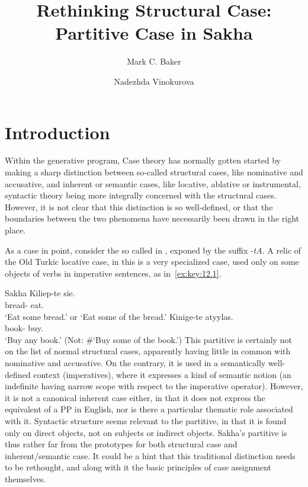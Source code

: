 \documentclass[output=paper]{langsci/langscibook}
\author{Mark C. Baker\affiliation{Rutgers University}\and Nadezhda Vinokurova\affiliation{Institute for Humanities Research and Indigenous Studies of the North, Siberian Branch, Russian Academy of Sciences}}
\title{Rethinking Structural Case: Partitive Case in Sakha}
\begin{document}
\glsresetall

\section{Introduction}

Within the generative program, Case theory has normally gotten started by
making a sharp distinction between so-called structural cases, like nominative
and accusative, and inherent or semantic
cases, like locative, ablative or
instrumental, syntactic theory being more integrally concerned with the
structural cases. However, it is not clear that this distinction is so
well-defined, or that the boundaries between the two phenomena have necessarily
been drawn in the right place.

As a case in point, consider the so called  in , exponed by
the suffix -\emph{tA}. A relic of the Old Turkic locative case, in  this
is a very specialized case, used only on some objects of verbs in imperative
sentences, as in~\eqref{ex:key:12.1}.

\ea\label{ex:key:12.1}Sakha \parencite[421, 429]{StachowskiMenz1998}
	\ea
		\gll Kiliep-te  sie.\\
			bread-\Part{}  eat.\Imp{}\\
		\glt ‘Eat some bread.’ or ‘Eat some of the bread.’
	\ex
		\gll Kinige-te  atyylas.\\
			book-\Part{}  buy.\Imp{}\\
		\glt ‘Buy any book.’  (Not: \#‘Buy some of the book.’)
	\z
\z
This partitive is certainly not on the list of normal
structural cases, apparently having little in common with nominative and
accusative. On the contrary, it is used in a semantically
well-defined context (imperatives), where it expresses a kind of semantic
notion (an indefinite having narrow scope with respect to the
imperative operator). However, it is not a canonical
inherent
case either, in that it does not express the equivalent of a PP in English, nor
is there a particular thematic role associated with it. Syntactic structure
seems relevant to the partitive, in that it is found only on
direct objects, not on subjects or indirect objects. Sakha’s
partitive is thus rather far from the prototypes for both
structural case and inherent/semantic case. It could be a hint that this
traditional distinction needs to be rethought, and along with it the basic
principles of case assignment themselves.
\end{document}
